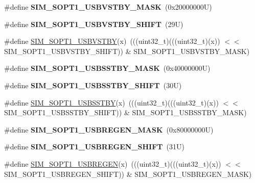 \begin{DoxyCompactItemize}
\item 
\mbox{\label{group___s_i_m___register___masks_gaaf0b406e4bd1800083f48727a7cde829}} 
\#define {\bfseries S\+I\+M\+\_\+\+S\+O\+P\+T1\+\_\+\+U\+S\+B\+V\+S\+T\+B\+Y\+\_\+\+M\+A\+SK}~(0x20000000\+U)
\item 
\mbox{\label{group___s_i_m___register___masks_gae945165e21faf14e58288bce0918482a}} 
\#define {\bfseries S\+I\+M\+\_\+\+S\+O\+P\+T1\+\_\+\+U\+S\+B\+V\+S\+T\+B\+Y\+\_\+\+S\+H\+I\+FT}~(29\+U)
\item 
\#define \mbox{\hyperlink{group___s_i_m___register___masks_ga3e1f9ad0a4fe10e7c1ae074ca63a674e}{S\+I\+M\+\_\+\+S\+O\+P\+T1\+\_\+\+U\+S\+B\+V\+S\+T\+BY}}(x)~(((uint32\+\_\+t)(((uint32\+\_\+t)(x)) $<$$<$ S\+I\+M\+\_\+\+S\+O\+P\+T1\+\_\+\+U\+S\+B\+V\+S\+T\+B\+Y\+\_\+\+S\+H\+I\+FT)) \& S\+I\+M\+\_\+\+S\+O\+P\+T1\+\_\+\+U\+S\+B\+V\+S\+T\+B\+Y\+\_\+\+M\+A\+SK)
\item 
\mbox{\label{group___s_i_m___register___masks_ga93a808f7a1d75e26bc3ed565ab257617}} 
\#define {\bfseries S\+I\+M\+\_\+\+S\+O\+P\+T1\+\_\+\+U\+S\+B\+S\+S\+T\+B\+Y\+\_\+\+M\+A\+SK}~(0x40000000\+U)
\item 
\mbox{\label{group___s_i_m___register___masks_ga8a24334d1be5bd01017bd364dd53f268}} 
\#define {\bfseries S\+I\+M\+\_\+\+S\+O\+P\+T1\+\_\+\+U\+S\+B\+S\+S\+T\+B\+Y\+\_\+\+S\+H\+I\+FT}~(30\+U)
\item 
\#define \mbox{\hyperlink{group___s_i_m___register___masks_ga06d22c15bc1d9c7845af3457543f6607}{S\+I\+M\+\_\+\+S\+O\+P\+T1\+\_\+\+U\+S\+B\+S\+S\+T\+BY}}(x)~(((uint32\+\_\+t)(((uint32\+\_\+t)(x)) $<$$<$ S\+I\+M\+\_\+\+S\+O\+P\+T1\+\_\+\+U\+S\+B\+S\+S\+T\+B\+Y\+\_\+\+S\+H\+I\+FT)) \& S\+I\+M\+\_\+\+S\+O\+P\+T1\+\_\+\+U\+S\+B\+S\+S\+T\+B\+Y\+\_\+\+M\+A\+SK)
\item 
\mbox{\label{group___s_i_m___register___masks_gac60c367119b3dcc752c4cf857b8a59b5}} 
\#define {\bfseries S\+I\+M\+\_\+\+S\+O\+P\+T1\+\_\+\+U\+S\+B\+R\+E\+G\+E\+N\+\_\+\+M\+A\+SK}~(0x80000000\+U)
\item 
\mbox{\label{group___s_i_m___register___masks_ga99e46c34c02e39338c9b80775bad09db}} 
\#define {\bfseries S\+I\+M\+\_\+\+S\+O\+P\+T1\+\_\+\+U\+S\+B\+R\+E\+G\+E\+N\+\_\+\+S\+H\+I\+FT}~(31\+U)
\item 
\#define \mbox{\hyperlink{group___s_i_m___register___masks_ga186d507e27612305db92407d2986a194}{S\+I\+M\+\_\+\+S\+O\+P\+T1\+\_\+\+U\+S\+B\+R\+E\+G\+EN}}(x)~(((uint32\+\_\+t)(((uint32\+\_\+t)(x)) $<$$<$ S\+I\+M\+\_\+\+S\+O\+P\+T1\+\_\+\+U\+S\+B\+R\+E\+G\+E\+N\+\_\+\+S\+H\+I\+FT)) \& S\+I\+M\+\_\+\+S\+O\+P\+T1\+\_\+\+U\+S\+B\+R\+E\+G\+E\+N\+\_\+\+M\+A\+SK)
\end{DoxyCompactItemize}
